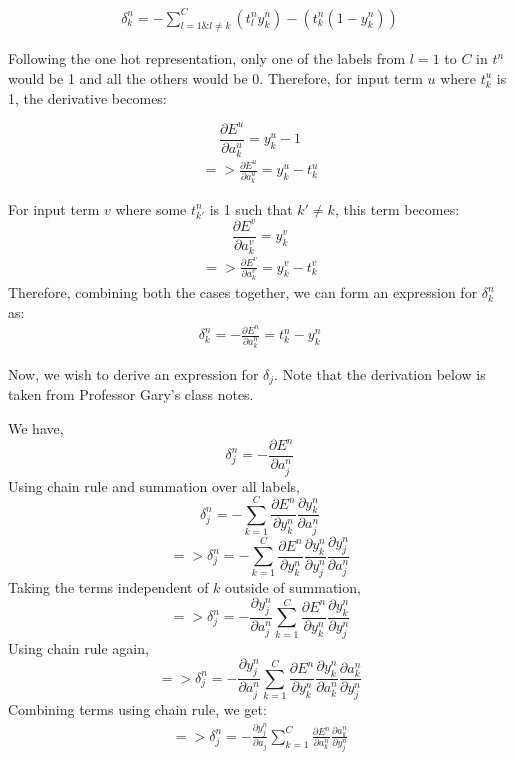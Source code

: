 \documentclass{article}
\begin{document}
\begin{align}
\delta_{k}^n = -\sum_{l=1 \& l \neq k}^{C}(t_l^{n}y_{k}^{n}) - (t_k^{n}(1 - y_{k}^{n}))
\end{align}

Following the one hot representation, only one of the labels from $l=1$ to $C$ in $t^{n}$ would be 1 and all the others would be 0.
Therefore, for input term $u$ where $t^{u}_{k}$ is 1, the derivative becomes:

$$\frac{\partial E^{u}}{\partial a_{k}^{u}} = y_{k}^{u} - 1$$
\begin{align}
=>\frac{\partial E^{u}}{\partial a_{k}^{u}} = y_{k}^{u} - t_{k}^{u}
\end{align}

For input term $v$ where some $t^{n}_{k'}$ is 1 such that $k' \neq k$, this term becomes:
$$\frac{\partial E^{v}}{\partial a_{k}^{v}} = y_{k}^{v}$$ 
\begin{align}
=>\frac{\partial E^{v}}{\partial a_{k}^{v}} = y_{k}^{v} - t^{v}_{k} 
\end{align}
Therefore, combining both the cases together, we can form an expression for $\delta_k^n$ as:
\begin{align}
\delta_k^n = - \frac{\partial E^{n}}{\partial a_{k}^{n}} = t^{n}_{k} - y_{k}^{n}
\end{align}

Now, we wish to derive an expression for $\delta_j$. Note that the derivation below is taken from Professor Gary's class notes. 

We have,
$$
\delta_{j}^{n} = - \frac{\partial E^{n}}{\partial a_{j}^{n}} $$
Using chain rule and summation over all labels,
$$
\delta_{j}^{n} = - \sum_{k=1}^{C} \frac{\partial E^{n}}{\partial y_{k}^{n}} \frac{\partial y_{k}^{n}}{\partial a_{j}^{n}} 
$$
$$
=> \delta_{j}^{n} = - \sum_{k=1}^{C} \frac{\partial E^{n}}{\partial y_{k}^{n}} \frac{\partial y_{k}^{n}}{\partial y_{j}^{n}} \frac{\partial y_{j}^{n}}{\partial a_{j}^{n}}
$$
Taking the terms independent of $k$ outside of summation,
$$
=> \delta_{j}^{n} = - \frac{\partial y_{j}^{n}}{\partial a_{j}^{n}} \sum_{k=1}^{C} \frac{\partial E^{n}}{\partial y_{k}^{n}} \frac{\partial y_{k}^{n}}{\partial y_{j}^{n}}
$$
Using chain rule again,
$$
=> \delta_{j}^{n} = - \frac{\partial y_{j}^{n}}{\partial a_{j}^{n}} \sum_{k=1}^{C} \frac{\partial E^{n}}{\partial y_{k}^{n}} \frac{\partial y_{k}^{n}}{\partial a_{k}^{n}} \frac{\partial a_{k}^{n}}{\partial y_{j}^{n}}
$$
Combining terms using chain rule, we get:
\begin{align}
=> \delta_{j}^{n} = - \frac{\partial y_{j}^{n}}{\partial a_{j}} \sum_{k=1}^{C} \frac{\partial E^{n}}{\partial a_{k}^{n}} \frac{\partial a_{k}^{n}}{\partial y_{j}^{n}}
\end{align}
\end{document}
